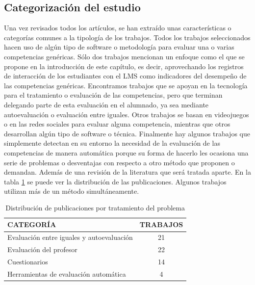 \subsection{Categorización del estudio}

Una vez revisados todos los artículos, se han extraído unas características o categorías comunes a la tipología de los trabajos. Todos los trabajos seleccionados hacen uso de algún tipo de software o metodología para evaluar una o varias competencias genéricas. Sólo dos trabajos mencionan un enfoque como el que se propone en la introducción de este capítulo, es decir, aprovechando los registros de interacción de los estudiantes con el LMS como indicadores del desempeño de las competencias genéricas. Encontramos trabajos que se apoyan en la tecnología para el tratamiento o evaluación de las competencias, pero que terminan delegando parte de esta evaluación en el alumnado, ya sea mediante autoevaluación o evaluación entre iguales. Otros trabajos se basan en videojuegos o en las redes sociales para evaluar alguna competencia, mientras que otros desarrollan algún tipo de software o técnica. Finalmente hay algunos trabajos que simplemente detectan en su entorno la necesidad de la evaluación de las competencias de manera automática porque su forma de hacerlo les ocasiona una serie de problemas o desventajas con respecto a otro método que proponen o demandan. Además de una revisión de la literatura que será tratada aparte.  En la tabla \ref{tab:PublicacionesForum} se puede ver la distribución de las publicaciones. Algunos trabajos utilizan más de un método simultáneamente. %

\begin{table}
  \begin{center}
  \begin{tabular}{| m{10cm} | c |}
    \hline
    CATEGORÍA & TRABAJOS\\
    \hline
    \hline 
    Evaluación entre iguales y autoevaluación & 21\\
    \hline
    Evaluación del profesor & 22\\
    \hline
    Cuestionarios & 14\\
    \hline
    Herramientas de evaluación automática & 4\\
    \hline
  \end{tabular}
\end{center}
\caption{Distribución de publicaciones por tratamiento del problema}
\label{tab:PublicacionesForum}
\end{table} 

